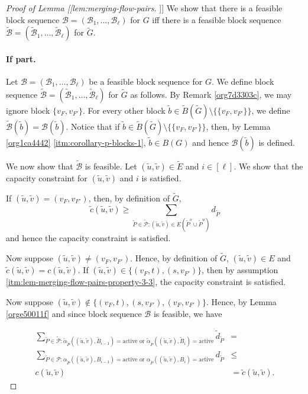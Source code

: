 \documentclass[fontsize=11pt,paper=a4]{book}
\begin{document}
\begin{proof}[Proof of Lemma [[lem:merging-flow-pairs]]]
We show that there is a feasible block sequence \(\mathcal{B}=(\mathscr{B}_1,\dots,\mathscr{B}_{\ell})\) for \(G\) iff there is a feasible block sequence \(\tilde{\mathcal{B}}=(\tilde{\mathscr{B}}_1,\dots,\tilde{\mathscr{B}}_{\ell})\) for \(\tilde{G}\).

\paragraph{If part.}
Let \(\mathcal{B}=(\mathscr{B}_1,\dots,\mathscr{B}_{\ell})\) be a feasible block sequence for \(G\).
We define block sequence \(\tilde{\mathcal{B}}=(\tilde{\mathscr{B}}_1,\dots,\tilde{\mathscr{B}}_{\ell})\) for \(\tilde{G}\) as follows.
By Remark \ref{org7d3303c}, we may ignore block \(\{v_F,v_{F'}\}\).
For every other block \(\tilde{b}\in\tilde{B}(\tilde{G})\setminus\{\{v_F,v_{F'}\}\}\), we define \(\tilde{\mathcal{B}}(\tilde{b})=\mathcal{B}(\tilde{b})\).
Notice that if \(\tilde{b}\in\tilde{B}(\tilde{G})\setminus\{\{v_F,v_{F'}\}\}\), then, by Lemma \ref{org1ca4442} \ref{itm:corollary-p-blocks-1}, \(\tilde{b}\in B(G)\) and hence \(\mathcal{B}(\tilde{b})\) is defined.

We now show that \(\tilde{\mathcal{B}}\) is feasible.
Let \((\tilde{u},\tilde{v})\in\tilde{E}\) and \(i\in[\ell]\).
We show that the capacity constraint for \((\tilde{u},\tilde{v})\) and \(i\) is satisfied.

If \((\tilde{u},\tilde{v})=(v_F,v_{F'})\), then, by definition of \(\tilde{G}\),
\[
\tilde{c}(\tilde{u},\tilde{v})\geq\sum_{\tilde{P}\in\tilde{\mathcal{P}}:(\tilde{u},\tilde{v})\in E(\tilde{P}^o\cup\tilde{P}^u)}d_{\tilde{P}}
\]
and hence the capacity constraint is satisfied.

Now suppose \((\tilde{u},\tilde{v})\neq(v_F,v_{F'})\).
Hence, by definition of \(\tilde{G}\), \((\tilde{u},\tilde{v})\in E\) and \(\tilde{c}(\tilde{u},\tilde{v})=c(\tilde{u},\tilde{v})\).
If \((\tilde{u},\tilde{v})\in\{(v_F,t),(s,v_{F'})\}\), then by assumption \ref{itm:lem-merging-flow-pairs-property-3-3}, the capacity constraint is satisfied.

Now suppose \((\tilde{u},\tilde{v})\notin\{(v_F,t),(s,v_{F'}),(v_F,v_{F'})\}\).
Hence, by Lemma \ref{orge50011f} and since block sequence \(\mathcal{B}\) is feasible, we have

\begin{align*}
\sum_{\tilde{P}\in\tilde{\mathcal{P}}:\tilde{\alpha}_{\tilde{P}}((\tilde{u},\tilde{v}),\tilde{B}_{i-1})=\mathrm{active}\text{ or }\tilde{\alpha}_{\tilde{P}}((\tilde{u},\tilde{v}),\tilde{B}_i)=\mathrm{active}}\tilde{d}_{\tilde{P}}&=\\
\sum_{\tilde{P}\in\mathcal{P}:\alpha_{\tilde{P}}((\tilde{u},\tilde{v}),B_{i-1})=\mathrm{active}\text{ or }\alpha_{\tilde{P}}((\tilde{u},\tilde{v}),B_i)=\mathrm{active}}d_{\tilde{P}}&\leq\\
c(\tilde{u},\tilde{v})&=
\tilde{c}(\tilde{u},\tilde{v}).
\end{align*}


\end{proof}
\end{document}
